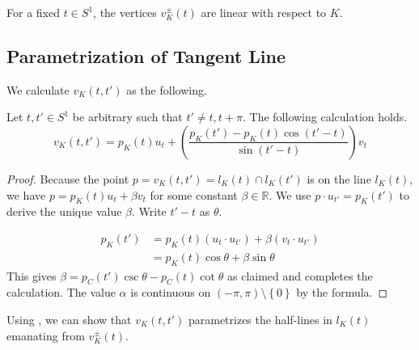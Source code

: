 \begin{corollary}

For a fixed \(t \in S^1\), the vertices \(v_K^{\pm}(t)\) are linear with respect to \(K\).

\label{cor:vertex-linear}
\end{corollary}

\subsection{Parametrization of Tangent Line}

We calculate \(v_K(t, t')\) as the following.

\begin{lemma}

Let \(t, t' \in S^1\) be arbitrary such that \(t' \neq t, t + \pi\). The following calculation holds.
\[
v_K(t, t') = p_K(t) u_{t} + \left( \frac{p_K(t') - p_K(t) \cos (t' - t)}{\sin (t' - t)} \right)  v_{t}
\]

\label{lem:intersection-tangent-lines}
\end{lemma}

\begin{proof}
Because the point \(p = v_K(t, t') = l_{K}(t) \cap l_K(t')\) is on the line \(l_K(t)\), we have \(p = p_K(t) u_{t} + \beta v_{t}\) for some constant \(\beta \in \mathbb{R}\). We use \(p \cdot u_{t'} = p_K(t')\) to derive the unique value \(\beta\). Write \(t' - t\) as \(\theta\).

\begin{align*}
p_K(t') &= p_K(t) (u_{t} \cdot u_{t'}) + \beta (v_{t} \cdot u_{t'}) \\
&= p_K(t) \cos \theta + \beta \sin \theta
\end{align*}
This gives \(\beta = p_C(t') \csc \theta - p_C(t) \cot \theta\) as claimed and completes the calculation. The value \(\alpha\) is continuous on \((-\pi, \pi) \setminus \left\{ 0 \right\}\) by the formula.
\end{proof}

Using , we can show that \(v_K(t, t')\) parametrizes the half-lines in \(l_K(t)\) emanating from \(v_K^{\pm}(t)\).

